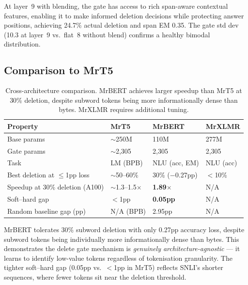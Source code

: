 \documentclass[11pt,a4paper]{article}
\begin{document}
At layer~9 with blending, the gate has access to rich span-aware contextual features, enabling it to make informed deletion decisions while protecting answer positions, achieving 24.7\% actual deletion and span EM 0.35. The gate std dev (10.3 at layer~9 vs.\ flat~8 without blend) confirms a healthy bimodal distribution.


\subsection{Comparison to MrT5}

\begin{table}[h]
\centering\small
\begin{tabular}{@{}llll@{}}
\toprule
\textbf{Property} & \textbf{MrT5} & \textbf{MrBERT} & \textbf{MrXLMR} \\
\midrule
Base params                             & $\sim$250M     & 110M            & 277M \\
Gate params                             & $\sim$2,305    & 2,305           & 2,305 \\
Task                                    & LM (BPB)       & NLU (acc, EM)   & NLU (acc) \\
Best deletion at $\leq$1pp loss         & $\sim$50--60\% & 30\% ($-$0.27pp) & $<$10\% \\
Speedup at 30\% deletion (A100)         & $\sim$1.3--1.5$\times$ & \textbf{1.89$\times$} & N/A \\
Soft--hard gap                          & $<$1pp         & \textbf{0.05pp}  & N/A \\
Random baseline gap (pp)                & N/A (BPB)      & 2.95pp          & N/A \\
\bottomrule
\end{tabular}
\caption{Cross-architecture comparison. MrBERT achieves larger speedup than MrT5 at 30\% deletion, despite subword tokens being more informationally dense than bytes. MrXLMR requires additional tuning.}
\label{tab:comparison-mrt5}
\end{table}

MrBERT tolerates 30\% subword deletion with only 0.27pp accuracy loss, despite subword tokens being individually more informationally dense than bytes. This demonstrates the delete gate mechanism is \emph{genuinely architecture-agnostic} --- it learns to identify low-value tokens regardless of tokenisation granularity. The tighter soft--hard gap (0.05pp vs.\ $<$1pp in MrT5) reflects SNLI's shorter sequences, where fewer tokens sit near the deletion threshold.
\end{document}
